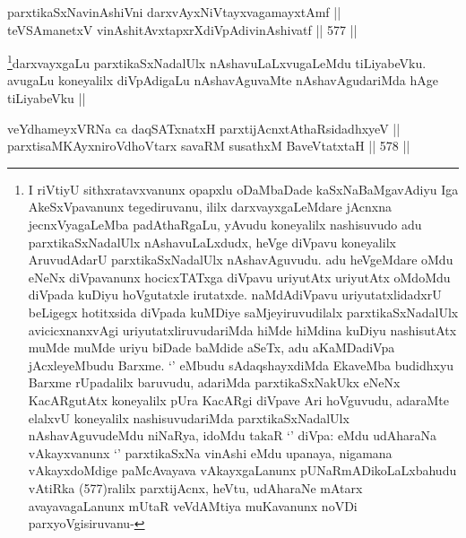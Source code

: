 
\begin{shl}
parxtikaSxNavinAshiVni darxvAyxNiVtayxvagamayxtAmf || \\
teVSAmanetxV vinAshitAvxtapxrXdiVpAdivinAshivatf ||  577 ||  
\end{shl}

\begin{artha}
\footnote{I riVtiyU sithxratavxvanunx opapxlu oDaMbaDade kaSxNaBaMgavAdiyu Iga AkeSxVpavanunx tegediruvanu, ililx darxvayxgaLeMdare jAcnxna jecnxVyagaLeMba padAthaRgaLu, yAvudu koneyalilx nashisuvudo adu parxtikaSxNadalUlx nAshavuLaLxdudx, heVge diVpavu koneyalilx AruvudAdarU parxtikaSxNadalUlx nAshavAguvudu. adu heVgeMdare oMdu eNeNx diVpavanunx hocicxTATxga diVpavu uriyutAtx uriyutAtx oMdoMdu diVpada kuDiyu hoVgutatxle irutatxde. naMdAdiVpavu uriyutatxlidadxrU beLigegx hotitxsida diVpada kuMDiye saMjeyiruvudilalx parxtikaSxNadalUlx avicicxnanxvAgi uriyutatxliruvudariMda hiMde hiMdina kuDiyu nashisutAtx muMde muMde uriyu biDade baMdide aSeTx, adu aKaMDadiVpa jAcxleyeMbudu Barxme. `\stext' eMbudu sAdaqshayxdiMda EkaveMba budidhxyu Barxme rUpadalilx baruvudu, adariMda parxtikaSxNakUkx eNeNx KacARgutAtx koneyalilx pUra KacARgi diVpave Ari hoVguvudu, adaraMte elalxvU koneyalilx nashisuvudariMda parxtikaSxNadalUlx nAshavAguvudeMdu niNaRya, idoMdu takaR `\stext' diVpa: eMdu udAharaNa vAkayxvanunx `\stext' parxtikaSxNa vinAshi eMdu upanaya, nigamana vAkayxdoMdige paMcAvayava vAkayxgaLanunx pUNaRmADikoLaLxbahudu vAtiRka (577)ralilx parxtijAcnx, heVtu, udAharaNe mAtarx avayavagaLanunx mUtaR veVdAMtiya muKavanunx noVDi parxyoVgisiruvanu-}darxvayxgaLu parxtikaSxNadalUlx nAshavuLaLxvugaLeMdu tiLiyabeVku. avugaLu koneyalilx diVpAdigaLu nAshavAguvaMte nAshavAgudariMda hAge tiLiyabeVku ||
\end{artha}


\begin{shl}
veYdhameyxVRNa ca daqSATxnatxH parxtijAcnxtAthaRsidadhxyeV || \\
parxtisaMKAyxniroVdhoV\s tarx savaRM susathxM BaveVtatxtaH ||  578 ||  
\end{shl}

